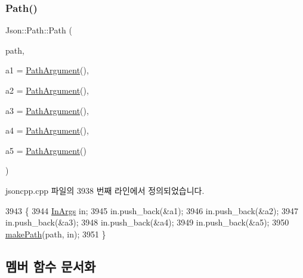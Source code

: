 \subsubsection{\texorpdfstring{Path()}{Path()}}
{\footnotesize\ttfamily Json\+::\+Path\+::\+Path (\begin{DoxyParamCaption}\item[{const \hyperlink{json_8h_a1e723f95759de062585bc4a8fd3fa4be}{J\+S\+O\+N\+C\+P\+P\+\_\+\+S\+T\+R\+I\+NG} \&}]{path,  }\item[{const \hyperlink{class_json_1_1_path_argument}{Path\+Argument} \&}]{a1 = {\ttfamily \hyperlink{class_json_1_1_path_argument}{Path\+Argument}()},  }\item[{const \hyperlink{class_json_1_1_path_argument}{Path\+Argument} \&}]{a2 = {\ttfamily \hyperlink{class_json_1_1_path_argument}{Path\+Argument}()},  }\item[{const \hyperlink{class_json_1_1_path_argument}{Path\+Argument} \&}]{a3 = {\ttfamily \hyperlink{class_json_1_1_path_argument}{Path\+Argument}()},  }\item[{const \hyperlink{class_json_1_1_path_argument}{Path\+Argument} \&}]{a4 = {\ttfamily \hyperlink{class_json_1_1_path_argument}{Path\+Argument}()},  }\item[{const \hyperlink{class_json_1_1_path_argument}{Path\+Argument} \&}]{a5 = {\ttfamily \hyperlink{class_json_1_1_path_argument}{Path\+Argument}()} }\end{DoxyParamCaption})}



jsoncpp.\+cpp 파일의 3938 번째 라인에서 정의되었습니다.


\begin{DoxyCode}
3943                                    \{
3944   \hyperlink{class_json_1_1_path_ab29d7b2fc896c7d3c5ed4609af3a3f23}{InArgs} in;
3945   in.push\_back(&a1);
3946   in.push\_back(&a2);
3947   in.push\_back(&a3);
3948   in.push\_back(&a4);
3949   in.push\_back(&a5);
3950   \hyperlink{class_json_1_1_path_a362a420a47acb1a1f9c79173cbfef94d}{makePath}(path, in);
3951 \}
\end{DoxyCode}


\subsection{멤버 함수 문서화}
\mbox{\label{class_json_1_1_path_ae65717a5fbc35b1336cbf783b15aad2e}} 

